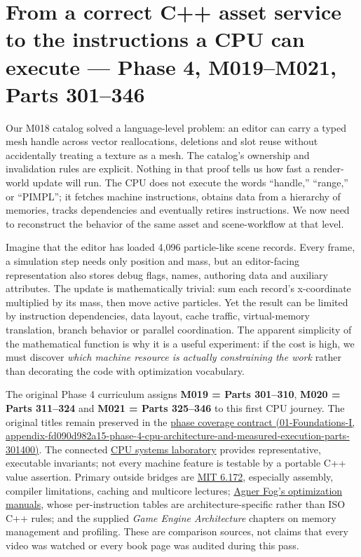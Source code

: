 \section{From a correct C++ asset service to the instructions a CPU can execute --- Phase 4, M019--M021, Parts 301--346}\label{05-engine-i-ch007-from-a-correct-c-asset-service-to-the-instructions-a-cpu-can-execute-phase-4-m019m021-parts-301346}

Our M018 catalog solved a language-level problem: an editor can carry a typed mesh handle across vector reallocations, deletions and slot reuse without accidentally treating a texture as a mesh. The catalog's ownership and invalidation rules are explicit. Nothing in that proof tells us how fast a render-world update will run. The CPU does not execute the words ``handle,'' ``range,'' or ``PIMPL''; it fetches machine instructions, obtains data from a hierarchy of memories, tracks dependencies and eventually retires instructions. We now need to reconstruct the behavior of the same asset and scene-workflow at that level.

Imagine that the editor has loaded 4,096 particle-like scene records. Every frame, a simulation step needs only position and mass, but an editor-facing representation also stores debug flags, names, authoring data and auxiliary attributes. The update is mathematically trivial: sum each record's x-coordinate multiplied by its mass, then move active particles. Yet the result can be limited by instruction dependencies, data layout, cache traffic, virtual-memory translation, branch behavior or parallel coordination. The apparent simplicity of the mathematical function is why it is a useful experiment: if the cost is high, we must discover \emph{which machine resource is actually constraining the work} rather than decorating the code with optimization vocabulary.

The original Phase 4 curriculum assigns \textbf{M019 = Parts 301--310}, \textbf{M020 = Parts 311--324} and \textbf{M021 = Parts 325--346} to this first CPU journey. The original titles remain preserved in the \href{../01-Foundations-I/main.pdf\#nameddest=appendix-fd090d982a15-phase-4-cpu-architecture-and-measured-execution-parts-301400}{phase coverage contract (01-Foundations-I, appendix-fd090d982a15-phase-4-cpu-architecture-and-measured-execution-parts-301400)}. The connected \hyperref[source-file-0060a91bd24dd25d6c14e679]{CPU systems laboratory} provides representative, executable invariants; not every machine feature is testable by a portable C++ value assertion. Primary outside bridges are \href{https://ocw.mit.edu/courses/6-172-performance-engineering-of-software-systems-fall-2018/video_galleries/lecture-videos/}{MIT 6.172}, especially assembly, compiler limitations, caching and multicore lectures; \href{https://www.agner.org/optimize/}{Agner Fog's optimization manuals}, whose per-instruction tables are architecture-specific rather than ISO C++ rules; and the supplied \emph{Game Engine Architecture} chapters on memory management and profiling. These are comparison sources, not claims that every video was watched or every book page was audited during this pass.

